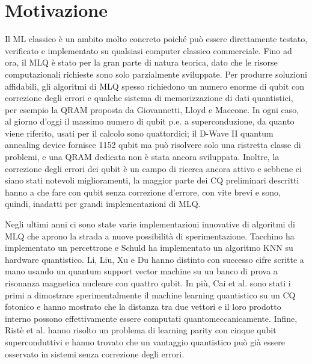 \section{Motivazione}

Il \ac{ML} classico è un ambito molto concreto poiché può essere direttamente testato, 
verificato e implementato su qualsiasi computer classico commerciale. 
Fino ad ora, il \ac{MLQ} è stato per la gran parte di natura teorica, dato che le risorse 
computazionali richieste sono solo parzialmente sviluppate. Per produrre soluzioni affidabili, 
gli algoritmi di \ac{MLQ} spesso richiedono un numero enorme di qubit con correzione 
degli errori e qualche sistema di memorizzazione di dati quantistici, per esempio la 
\ac{QRAM} proposta da Giovannetti, Lloyd e Maccone. %
In ogni caso, al giorno d'oggi il massimo numero di qubit p.e. a superconduzione, da quanto 
viene riferito, usati per il calcolo sono quattordici; 
il D-Wave II quantum annealing device fornisce 1152 qubit ma può risolvere solo una ristretta 
classe di problemi, e una \ac{QRAM} dedicata non è stata ancora sviluppata. %
Inoltre, la correzione degli errori dei qubit è un campo di ricerca ancora attivo 
e sebbene ci siano stati notevoli miglioramenti, %
la maggior parte dei \ac{CQ} preliminari descritti hanno a che fare con qubit senza correzione 
d'errore, con vite brevi e sono, quindi, inadatti per grandi implementazioni di \ac{MLQ}. 

Negli ultimi anni ci sono state varie implementazioni innovative di algoritmi di \ac{MLQ} che 
aprono la strada a nuove possibilità di sperimentazione. 
Tacchino\cite{tacchino} ha implementato un percettrone e Schuld\cite{schuld} ha implementato un 
algoritmo \ac{KNN} su hardware quantistico. 
Li, Liu, Xu e Du hanno distinto con successo cifre scritte a mano usando un quantum support 
vector machine su un banco di prova a risonanza magnetica nucleare con quattro qubit. In più, 
Cai et al. sono stati i primi a dimostrare sperimentalmente il machine learning quantistico su 
un \ac{CQ} fotonico e hanno mostrato che la distanza tra due vettori e il loro prodotto 
interno possono effettivamente essere computati quantomeccanicamente. 
Infine, Ristè et al. hanno risolto un problema di learning parity con cinque qubit 
superconduttivi e hanno trovato che un vantaggio quantistico può già essere osservato 
in sistemi senza correzione degli errori. 

